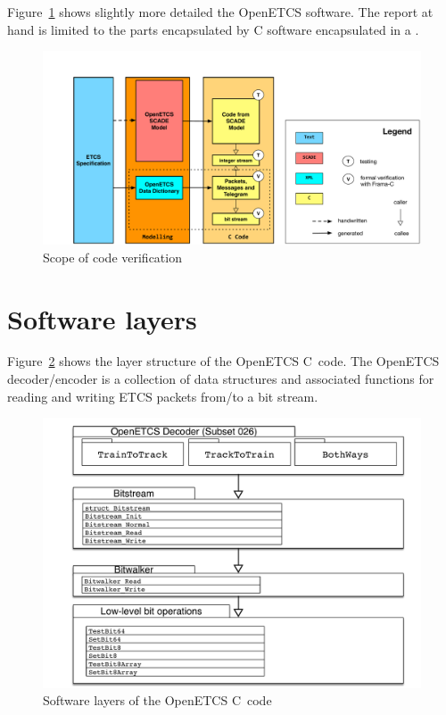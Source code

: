 Figure~\ref{fig:scope-of-code-verification} shows slightly more detailed
the OpenETCS software.
The report at hand is limited to the parts encapsulated by C software encapsulated 
in a .

\clearpage

\begin{figure}[hbt]
\begin{center}
\includegraphics[width=0.95\textheight,angle=90]{figures/OpenETCS-Stack.pdf}
\caption{\label{fig:scope-of-code-verification} Scope of code verification}
\end{center}
\end{figure}

\FloatBarrier

\section{Software layers}

Figure~\ref{fig:software-layers} shows the layer structure of the OpenETCS C~code.
The OpenETCS decoder\slash encoder is a collection of data structures and associated functions
for reading and writing ETCS packets from\slash to a bit stream.

\begin{figure}[hbt]
\begin{center}
\includegraphics[width=1.0\textwidth]{figures/software-layers.pdf}
\caption{\label{fig:software-layers} Software layers of the OpenETCS C~code}
\end{center}
\end{figure}

